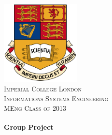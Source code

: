 \begin{titlepage}
\begin{center}

\includegraphics[width=0.30\textwidth]{./logo.png}\\[0.45cm]    

\textsc{\LARGE Imperial College London}\\[1cm]
\textsc{\Large Informations Systems Engineering \\ \vspace{5pt} MEng Class of 2013}\\[0.5cm]


\HRule \\[0.4cm]
{ \huge \bfseries Group Project}\\[0.4cm]

\HRule \\[1.5cm]


\end{center}
\end{titlepage}

